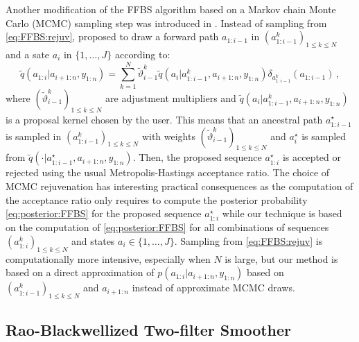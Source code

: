 \documentclass[nolayout]{article}
\theoremstyle{plain}
\theoremstyle{definition}
\newcommand{\1}{\mathbbm{1}}
\def\eqsp{\,}
\begin{document}
Another modification of the FFBS algorithm based on a Markov chain Monte Carlo (MCMC) sampling step was introduced in \cite[Section~5.2]{lindsten:bunch:sarkka:schon:godsill:2015}. Instead of sampling from \eqref{eq:FFBS:rejuv}, \cite[Section~5.2]{lindsten:bunch:sarkka:schon:godsill:2015} proposed to draw a forward path $a_{1:i-1}$ in $(a^k_{1:i-1})_{1\le k \le N}$ and a sate $a_i$ in $\{1,\ldots,J\}$ according to:
\[
\widetilde{q}(a_{1:i}|a_{i+1:n},y_{1:n}) = \sum_{k=1}^N \widetilde{\vartheta}^k_{i-1}\widetilde{q}(a_{i}|a^k_{1:i-1},a_{i+1:n},y_{1:n})\delta_{a^k_{1:i-1}}(a_{1:i-1})\eqsp,
\]
where $(\widetilde{\vartheta}^k_{i-1})_{1\le k \le N}$ are adjustment multipliers and $\widetilde{q}(a_{i}|a^k_{1:i-1},a_{i+1:n},y_{1:n})$ is a proposal kernel chosen by the user. This means that an ancestral path $a^{\star}_{1:i-1}$ is sampled in $(a^k_{1:i-1})_{1\le k \le N}$ with weights $(\widetilde{\vartheta}^k_{i-1})_{1\le k \le N}$ and $a^{\star}_i$ is sampled from $\widetilde{q}(\cdot|a^{\star}_{1:i-1},a_{i+1:n},y_{1:n})$. Then, the proposed sequence $a^{\star}_{1:i}$ is accepted or rejected using the usual Metropolis-Hastings acceptance ratio. The choice of MCMC rejuvenation has interesting practical consequences as the computation of the acceptance ratio only requires to compute the posterior probability \eqref{eq:posterior:FFBS} for the proposed sequence $a^{\star}_{1:i}$ while our technique is based on the computation of  \eqref{eq:posterior:FFBS} for all combinations of sequences $(a^{k}_{1:i})_{1\le k \le N}$ and states $a_i\in\{1,\ldots,J\}$. Sampling from \eqref{eq:FFBS:rejuv} is computationally more intensive, especially when $N$ is large, but our method is based on a direct approximation of $p(a_{1:i}|a_{i+1:n},y_{1:n})$ based on  $(a^k_{1:i-1})_{1\le k \le N}$ and $a_{i+1:n}$ instead of approximate MCMC draws. 



\subsection{Rao-Blackwellized Two-filter Smoother}
\label{sec:two-filer}
\end{document}
